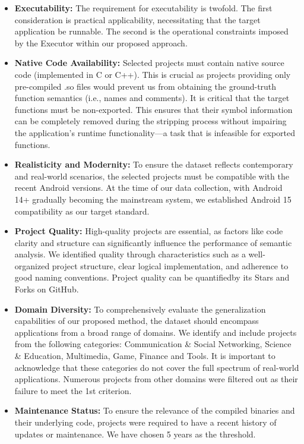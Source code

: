 \documentclass[acmsmall,screen,review,anonymous]{acmart} %
\begin{document}
\begin{itemize}
    \item \textbf{Executability:} The requirement for executability is twofold. The first consideration is practical applicability, necessitating that the target application be runnable. The second is the operational constraints imposed by the Executor within our proposed approach.

    \item \textbf{Native Code  Availability:} Selected projects must contain native source code (implemented in C or C++). This is crucial as projects providing only pre-compiled .so files would prevent us from obtaining the ground-truth function semantics (i.e., names and comments). It is critical that the target functions must be non-exported. This ensures that their symbol information can be completely removed during the stripping process without impairing the application's runtime functionality—a task that is infeasible for exported functions.

    \item \textbf{Realisticity and Modernity:} To ensure the dataset reflects contemporary and real-world scenarios, the selected projects must be compatible with the recent Android versions. At the time of our data collection, with Android 14+ gradually becoming the mainstream system, we established Android 15 compatibility as our target standard.

    \item \textbf{Project Quality:} High-quality projects are essential, as factors like code clarity and structure can significantly influence the performance of semantic analysis. We identified quality through characteristics such as a well-organized project structure, clear logical implementation, and adherence to good naming conventions. Project quality can be quantifiedby its Stars and Forks on GitHub.

    \item \textbf{Domain Diversity:} To comprehensively evaluate the generalization capabilities of our proposed method, the dataset should encompass applications from a broad range of domains. We identify and include projects from the following categories: Communication \& Social Networking,  Science \& Education, Multimedia, Game, Finance and Tools. It is important to acknowledge that these categories do not cover the full spectrum of real-world applications. Numerous projects from other domains were filtered out as their failure to meet the 1st criterion.

    \item \textbf{Maintenance Status:} To ensure the relevance of the compiled binaries and their underlying code, projects were required to have a recent history of updates or maintenance. We have chosen 5 years as the threshold.
\end{itemize}
\end{document}
